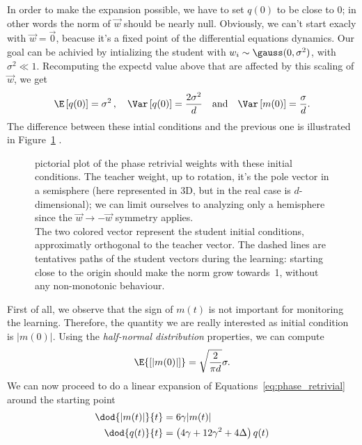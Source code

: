 In order to make the expansion possible, we have to set \(q(0)\) to be close to 0;
in other words the norm of \(\vec{w}\) should be nearly null.
Obviously, we can't start exacly with \(\vec{w}=\vec{0}\), beacuse it's a fixed point
of the differential equations dynamics.
Our goal can be achivied by intializing the student with \(w_{i}\sim\gauss(0,\sigma^2)\),
with \(\sigma^2\ll1\).
Recomputing the expectd value above that are affected by this scaling of \(\vec{w}\), we get 
\[
  \E\left[q(0)\right] = \sigma^2\,, \quad
  \Var\left[q(0)\right] = \frac{2\sigma^2}{d}\quad\text{and}\quad
  \Var\left[m{(0)}\right] = \frac{\sigma}{d}. 
\]
The difference between these intial conditions and the previous one is illustrated in Figure~\ref{fig:pictorial-unconstrainted-phase-retrivial} .
\begin{figure}
  \centering
  \begin{tikzpicture}  
    
  \end{tikzpicture}
  \caption{
    pictorial plot of the phase retrivial weights with these initial conditions.
    The teacher weight, up to rotation, it's the pole vector in a semisphere 
    (here represented in 3D, but in the real case is \(d\)-dimensional);
    we can limit ourselves to analyzing only a hemisphere since the \(\vec{w}\to-\vec{w}\) symmetry applies.\\
    The two colored vector represent the student initial conditions, approximatly orthogonal to the teacher vector. 
    The dashed lines are tentatives paths of the student vectors during the learning: starting close to the origin
    should make the norm grow towards~1, without any non-monotonic behaviour.
  }
  \label{fig:pictorial-unconstrainted-phase-retrivial} 
\end{figure}
First of all, we observe that the sign of \(m(t)\) is not important for monitoring the learning. Therefore, the quantity
we are really interested as initial condition is \(|m{(0)}|\). Using the \emph{half-normal distribution} properties\cite{enwiki:halfnormaldistribution},
we can compute
\[
  \E{\left[|m{(0)}|\right]} = \sqrt{\frac{2}{\pi d}}\sigma.
\]
We can now proceed to do a linear expansion of Equations~\eqref{eq:phase_retrivial} around the starting point
\begin{subequations}\begin{align}
  \dod{|m{(t)}|}{t} &= 6 \gamma |m{(t)}|\\
  \label{eq:sigma_phase_retrivial_q}
  \dod{q{(t)}}{t} &= \left(4 \gamma + 12 \gamma^2 + 4\Delta\right) q{(t)}
\end{align}\end{subequations}
